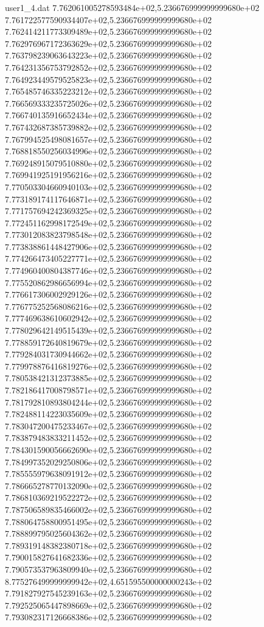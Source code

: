 \begin{filecontents}{user1_4.dat}
7.762061005278593484e+02,5.236676999999999680e+02
7.761722577590934407e+02,5.236676999999999680e+02
7.762414211773309489e+02,5.236676999999999680e+02
7.762976967172363629e+02,5.236676999999999680e+02
7.763798239063643223e+02,5.236676999999999680e+02
7.764231356753792852e+02,5.236676999999999680e+02
7.764923449579525823e+02,5.236676999999999680e+02
7.765485746335223212e+02,5.236676999999999680e+02
7.766569333235725026e+02,5.236676999999999680e+02
7.766740135916652434e+02,5.236676999999999680e+02
7.767432687385739882e+02,5.236676999999999680e+02
7.767994525498081657e+02,5.236676999999999680e+02
7.768818550256034996e+02,5.236676999999999680e+02
7.769248915079510880e+02,5.236676999999999680e+02
7.769941925191956216e+02,5.236676999999999680e+02
7.770503304660940103e+02,5.236676999999999680e+02
7.773189174117646871e+02,5.236676999999999680e+02
7.771757694242369325e+02,5.236676999999999680e+02
7.772451162998172549e+02,5.236676999999999680e+02
7.773012083823798548e+02,5.236676999999999680e+02
7.773838861448427906e+02,5.236676999999999680e+02
7.774266473405227771e+02,5.236676999999999680e+02
7.774960400804387746e+02,5.236676999999999680e+02
7.775520862986656994e+02,5.236676999999999680e+02
7.776617306002929126e+02,5.236676999999999680e+02
7.776775252568086216e+02,5.236676999999999680e+02
7.777469638610602942e+02,5.236676999999999680e+02
7.778029642149515439e+02,5.236676999999999680e+02
7.778859172640819679e+02,5.236676999999999680e+02
7.779284031730944662e+02,5.236676999999999680e+02
7.779978876416819276e+02,5.236676999999999680e+02
7.780538421312373885e+02,5.236676999999999680e+02
7.782186417008798571e+02,5.236676999999999680e+02
7.781792810893804244e+02,5.236676999999999680e+02
7.782488114223035609e+02,5.236676999999999680e+02
7.783047200475233467e+02,5.236676999999999680e+02
7.783879483833211452e+02,5.236676999999999680e+02
7.784301590056662690e+02,5.236676999999999680e+02
7.784997352029250806e+02,5.236676999999999680e+02
7.785555979638091912e+02,5.236676999999999680e+02
7.786665278770132090e+02,5.236676999999999680e+02
7.786810369219522272e+02,5.236676999999999680e+02
7.787506589835466002e+02,5.236676999999999680e+02
7.788064758800951495e+02,5.236676999999999680e+02
7.788899795025604362e+02,5.236676999999999680e+02
7.789319148382380718e+02,5.236676999999999680e+02
7.790015827641682336e+02,5.236676999999999680e+02
7.790573537963809940e+02,5.236676999999999680e+02
8.775276499999999942e+02,4.651595500000000243e+02
7.791827927545239163e+02,5.236676999999999680e+02
7.792525065447898669e+02,5.236676999999999680e+02
7.793082317126668386e+02,5.236676999999999680e+02

\end{filecontents}
